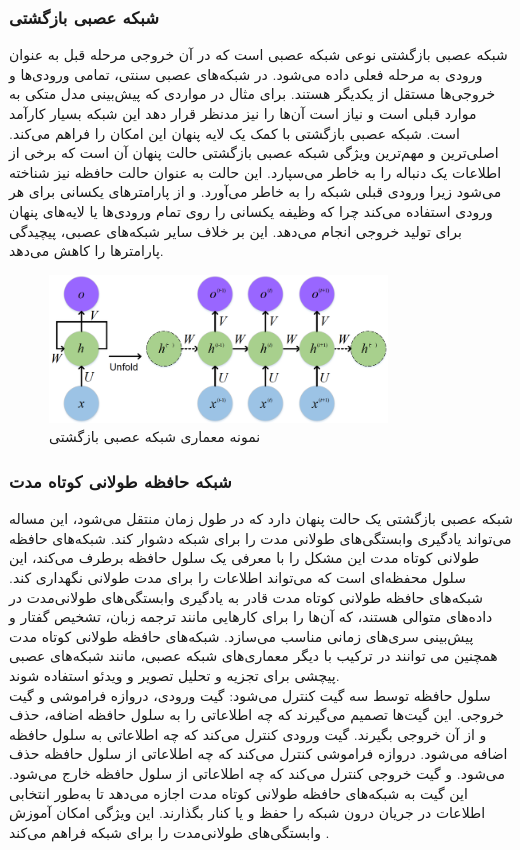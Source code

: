 \subsubsection{شبکه عصبی بازگشتی}
شبکه عصبی بازگشتی  نوعی شبکه عصبی است که در آن خروجی مرحله قبل به عنوان ورودی به مرحله فعلی داده می‌شود. در شبکه‌های عصبی سنتی، تمامی ورودی‌ها و خروجی‌ها مستقل از یکدیگر 
هستند. برای مثال در مواردی که پیش‌بینی مدل متکی به موارد قبلی است و نیاز است آن‌ها را نیز مدنظر قرار دهد این شبکه بسیار کارآمد است. شبکه عصبی بازگشتی با کمک یک لایه پنهان این امکان را فراهم می‌کند. اصلی‌ترین و مهم‌ترین 
ویژگی شبکه عصبی بازگشتی حالت پنهان آن است که برخی از اطلاعات یک دنباله را به خاطر می‌سپارد. این حالت به عنوان حالت حافظه نیز شناخته می‌شود زیرا ورودی قبلی شبکه را به خاطر می‌آورد. و از پارامترهای یکسانی برای هر 
ورودی استفاده می‌کند چرا که وظیفه یکسانی را روی تمام ورودی‌ها یا لایه‌های پنهان برای تولید خروجی انجام می‌دهد. این بر خلاف سایر شبکه‌های عصبی، پیچیدگی پارامترها را کاهش می‌دهد.


\begin{figure}[h]
    \centering
    \includegraphics[width=0.8\textwidth]{RNN.png}
    \caption[نمونه معماری شبکه عصبی بازگشتی]{نمونه معماری شبکه عصبی بازگشتی\cite{inproceedings}}
\end{figure}

\subsubsection{شبکه‌ حافظه طولانی کوتاه مدت}
شبکه عصبی بازگشتی یک حالت پنهان دارد که در طول زمان منتقل می‌شود، این مساله می‌تواند یادگیری وابستگی‌های طولانی مدت را برای شبکه دشوار کند. شبکه‌های حافظه طولانی کوتاه مدت
این مشکل را با معرفی یک سلول حافظه برطرف می‌کند، این سلول محفظه‌ای است که می‌تواند اطلاعات را برای مدت طولانی نگهداری کند. شبکه‌های حافظه طولانی کوتاه مدت 
 قادر به یادگیری وابستگی‌های طولانی‌مدت در داده‌های متوالی هستند، که آن‌ها را برای کارهایی مانند ترجمه زبان، تشخیص گفتار و پیش‌بینی 
سری‌های زمانی مناسب می‌سازد. شبکه‌های حافظه طولانی کوتاه مدت همچنین می توانند در ترکیب با دیگر معماری‌های شبکه عصبی، مانند شبکه‌های عصبی پیچشی برای تجزیه و تحلیل تصویر و ویدئو استفاده شوند.
\\
سلول حافظه توسط سه گیت کنترل می‌شود: گیت ورودی، دروازه فراموشی و گیت خروجی. این گیت‌ها تصمیم می‌گیرند که چه اطلاعاتی را به سلول حافظه اضافه، حذف  و از آن خروجی بگیرند. گیت ورودی کنترل می‌کند که چه اطلاعاتی 
به سلول حافظه اضافه می‌شود. دروازه فراموشی کنترل می‌کند که چه اطلاعاتی از سلول حافظه حذف می‌شود. و گیت خروجی کنترل می‌کند که چه اطلاعاتی از سلول حافظه خارج می‌‌شود.
این  گیت به شبکه‌های حافظه طولانی کوتاه مدت اجازه می‌دهد تا به‌طور انتخابی اطلاعات در جریان درون شبکه را حفظ  و یا کنار بگذارند. این ویژگی امکان آموزش وابستگی‌های طولانی‌مدت را برای شبکه فراهم می‌کند .

